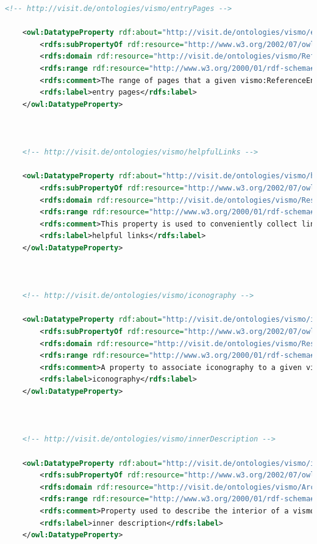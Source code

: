 \begin{lstlisting}[caption={VisMo Ontologie in der letzten (englischen) Version.},label={lst:vismo},captionpos=b,language=xml]
    <!-- http://visit.de/ontologies/vismo/entryPages -->

    <owl:DatatypeProperty rdf:about="http://visit.de/ontologies/vismo/entryPages">
        <rdfs:subPropertyOf rdf:resource="http://www.w3.org/2002/07/owl#topDataProperty"/>
        <rdfs:domain rdf:resource="http://visit.de/ontologies/vismo/ReferenceEntry"/>
        <rdfs:range rdf:resource="http://www.w3.org/2000/01/rdf-schema#Literal"/>
        <rdfs:comment>The range of pages that a given vismo:ReferenceEntry references of a vismo:Reference entity.</rdfs:comment>
        <rdfs:label>entry pages</rdfs:label>
    </owl:DatatypeProperty>
    


    <!-- http://visit.de/ontologies/vismo/helpfulLinks -->

    <owl:DatatypeProperty rdf:about="http://visit.de/ontologies/vismo/helpfulLinks">
        <rdfs:subPropertyOf rdf:resource="http://www.w3.org/2002/07/owl#topDataProperty"/>
        <rdfs:domain rdf:resource="http://visit.de/ontologies/vismo/Resource"/>
        <rdfs:range rdf:resource="http://www.w3.org/2000/01/rdf-schema#Literal"/>
        <rdfs:comment>This property is used to conveniently collect links to online resources that contain further information of the associated vismo:Resource.</rdfs:comment>
        <rdfs:label>helpful links</rdfs:label>
    </owl:DatatypeProperty>
    


    <!-- http://visit.de/ontologies/vismo/iconography -->

    <owl:DatatypeProperty rdf:about="http://visit.de/ontologies/vismo/iconography">
        <rdfs:subPropertyOf rdf:resource="http://www.w3.org/2002/07/owl#topDataProperty"/>
        <rdfs:domain rdf:resource="http://visit.de/ontologies/vismo/Resource"/>
        <rdfs:range rdf:resource="http://www.w3.org/2000/01/rdf-schema#Literal"/>
        <rdfs:comment>A property to associate iconography to a given vismo:Resource entity.</rdfs:comment>
        <rdfs:label>iconography</rdfs:label>
    </owl:DatatypeProperty>
    


    <!-- http://visit.de/ontologies/vismo/innerDescription -->

    <owl:DatatypeProperty rdf:about="http://visit.de/ontologies/vismo/innerDescription">
        <rdfs:subPropertyOf rdf:resource="http://www.w3.org/2002/07/owl#topDataProperty"/>
        <rdfs:domain rdf:resource="http://visit.de/ontologies/vismo/Architecture"/>
        <rdfs:range rdf:resource="http://www.w3.org/2000/01/rdf-schema#Literal"/>
        <rdfs:comment>Property used to describe the interior of a vismo:Architecture entity.</rdfs:comment>
        <rdfs:label>inner description</rdfs:label>
    </owl:DatatypeProperty>
    



\end{lstlisting}
